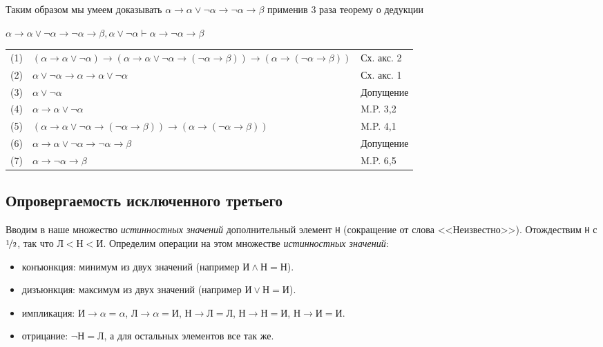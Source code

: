 Таким образом мы умеем доказывать $\alpha \rightarrow \alpha \vee \neg \alpha \rightarrow \neg \alpha \rightarrow \beta$ применив 3 раза теорему о дедукции
\begin{lemma}
$\alpha \rightarrow \alpha \vee \neg \alpha \rightarrow \neg \alpha \rightarrow \beta, \alpha \vee \neg \alpha \vdash \alpha \rightarrow \neg \alpha \rightarrow \beta$
\end{lemma}
\begin{tabular}{lll}
(1) & $(\alpha \rightarrow \alpha \vee \neg \alpha) \rightarrow (\alpha \rightarrow \alpha \vee \neg \alpha \rightarrow (\neg \alpha \rightarrow \beta)) \rightarrow (\alpha \rightarrow (\neg \alpha \rightarrow \beta))$& Сх. акс. 2\\
(2) & $\alpha \vee \neg \alpha \rightarrow \alpha \rightarrow \alpha \vee \neg \alpha$& Сх. акс. 1\\
(3) & $\alpha \vee \neg \alpha$& Допущение\\
(4) & $\alpha \rightarrow \alpha \vee \neg \alpha$& M.P. 3,2\\
(5) & $(\alpha \rightarrow \alpha \vee \neg \alpha \rightarrow (\neg \alpha \rightarrow \beta)) \rightarrow (\alpha \rightarrow (\neg \alpha \rightarrow \beta))$& M.P. 4,1\\
(6) & $\alpha \rightarrow \alpha \vee \neg \alpha \rightarrow \neg \alpha \rightarrow \beta$& Допущение\\
(7) & $\alpha \rightarrow \neg \alpha \rightarrow \beta$& M.P. 6,5\\
\end{tabular}

\subsection{Опровергаемость исключенного третьего}
\label{sec-5-2}
Вводим в наше множество \emph{истинностных значений} дополнительный элемент \texttt{Н} (сокращение от слова <<Неизвестно>>). Отождествим \texttt{Н} с $\nicefrac{1}{2}$, так что $\texttt{Л} < \texttt{Н} < \texttt{И}$. Определим операции на этом множестве \emph{истинностных значений}:
\begin{itemize}
\item конъюнкция: минимум из двух значений (например $\texttt{И} \land \texttt{Н} = \texttt{Н}$).
\item дизъюнкция: максимум из двух значений (например $\texttt{И} \vee \texttt{Н} = \texttt{И}$).
\item импликация: $\texttt{И} \rightarrow \alpha = \alpha$, $\texttt{Л} \rightarrow \alpha = \texttt{И}$, $\texttt{Н} \rightarrow \texttt{Л} = \texttt{Л}$, $\texttt{Н} \rightarrow \texttt{Н} = \texttt{И}$, $\texttt{Н} \rightarrow \texttt{И} = \texttt{И}$.
\item отрицание: $\neg \texttt{Н} = \texttt{Л}$, а для остальных элементов все так же.
\end{itemize}

